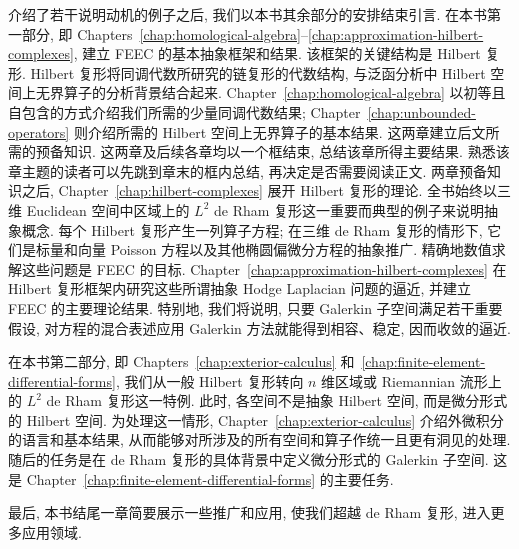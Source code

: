 \begin{table}[H]\centering
\caption{{前 12 个 Maxwell 特征值及其 Galerkin 近似.}}\label{tab:maxwell-spectral-comparison}
\end{table}

{介绍了若干说明动机的例子之后, 我们以本书其余部分的安排结束引言. 在本书第一部分, 即 Chapters~\ref{chap:homological-algebra}--\ref{chap:approximation-hilbert-complexes}, 建立 FEEC 的基本抽象框架和结果. 该框架的关键结构是 Hilbert 复形. Hilbert 复形将同调代数所研究的链复形的代数结构, 与泛函分析中 Hilbert 空间上无界算子的分析背景结合起来. Chapter~\ref{chap:homological-algebra} 以初等且自包含的方式介绍我们所需的少量同调代数结果; Chapter~\ref{chap:unbounded-operators} 则介绍所需的 Hilbert 空间上无界算子的基本结果. 这两章建立后文所需的预备知识. 这两章及后续各章均以一个框结束, 总结该章所得主要结果. 熟悉该章主题的读者可以先跳到章末的框内总结, 再决定是否需要阅读正文. 两章预备知识之后, Chapter~\ref{chap:hilbert-complexes} 展开 Hilbert 复形的理论. 全书始终以三维 Euclidean 空间中区域上的 $L^2$ de Rham 复形这一重要而典型的例子来说明抽象概念. 每个 Hilbert 复形产生一列算子方程; 在三维 de Rham 复形的情形下, 它们是标量和向量 Poisson 方程以及其他椭圆偏微分方程的抽象推广. 精确地数值求解这些问题是 FEEC 的目标. Chapter~\ref{chap:approximation-hilbert-complexes} 在 Hilbert 复形框架内研究这些所谓抽象 Hodge Laplacian 问题的逼近, 并建立 FEEC 的主要理论结果. 特别地, 我们将说明, 只要 Galerkin 子空间满足若干重要假设, 对方程的混合表述应用 Galerkin 方法就能得到相容、稳定, 因而收敛的逼近.}

{在本书第二部分, 即 Chapters~\ref{chap:exterior-calculus} 和~\ref{chap:finite-element-differential-forms}, 我们从一般 Hilbert 复形转向 $n$ 维区域或 Riemannian 流形上的 $L^2$ de Rham 复形这一特例. 此时, 各空间不是抽象 Hilbert 空间, 而是微分形式的 Hilbert 空间. 为处理这一情形, Chapter~\ref{chap:exterior-calculus} 介绍外微积分的语言和基本结果, 从而能够对所涉及的所有空间和算子作统一且更有洞见的处理. 随后的任务是在 de Rham 复形的具体背景中定义微分形式的 Galerkin 子空间. 这是 Chapter~\ref{chap:finite-element-differential-forms} 的主要任务.}

{最后, 本书结尾一章简要展示一些推广和应用, 使我们超越 de Rham 复形, 进入更多应用领域.}

